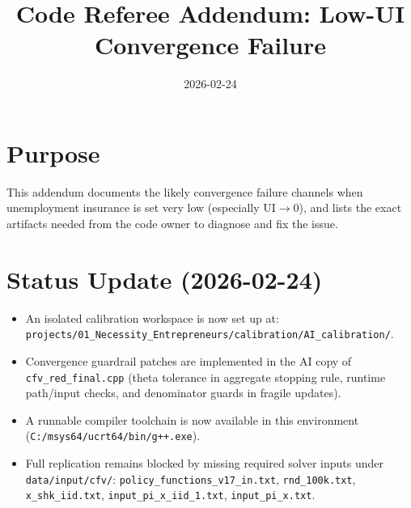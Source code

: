 \documentclass[11pt]{article}
\title{Code Referee Addendum: Low-UI Convergence Failure}
\date{2026-02-24}
\begin{document}
\maketitle

\section*{Purpose}
This addendum documents the likely convergence failure channels when unemployment insurance is set very low (especially UI$\rightarrow 0$), and lists the exact artifacts needed from the code owner to diagnose and fix the issue.

\section*{Status Update (2026-02-24)}
\begin{itemize}
\item An isolated calibration workspace is now set up at:
\texttt{projects/01\_Necessity\_Entrepreneurs/calibration/AI\_calibration/}.
\item Convergence guardrail patches are implemented in the AI copy of
\texttt{cfv\_red\_final.cpp} (theta tolerance in aggregate stopping rule,
runtime path/input checks, and denominator guards in fragile updates).
\item A runnable compiler toolchain is now available in this environment
(\texttt{C:/msys64/ucrt64/bin/g++.exe}).
\item Full replication remains blocked by missing required solver inputs under
\texttt{data/input/cfv/}: \texttt{policy\_functions\_v17\_in.txt},
\texttt{rnd\_100k.txt}, \texttt{x\_shk\_iid.txt},
\texttt{input\_pi\_x\_iid\_1.txt}, \texttt{input\_pi\_x.txt}.
\end{itemize}
\end{document}
